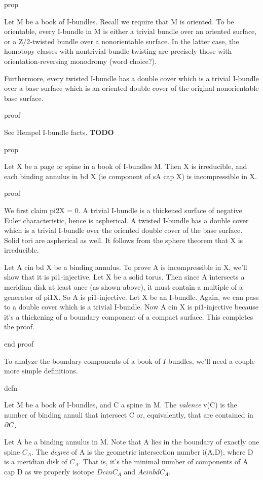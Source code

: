 prop

Let M be a book of I-bundles. Recall we require that M is oriented. To be
orientable, every I-bundle in M is either a trivial bundle over an oriented
surface, or a Z/2-twisted bundle over a nonorientable surface. In the latter
case, the homotopy classes with nontrivial bundle twisting are precisely those
with orientation-reversing monodromy (word choice?).

Furthermore, every twisted I-bundle has a double cover which is a trivial
I-bundle over a base surface which is an oriented double cover of the original
nonorientable base surface.

proof

See Hempel I-bundle facts. {\bf TODO}

prop

Let X be a page or spine in a book of I-bundles M. Then X is irreducible, and
each binding annulus in bd X (ie component of sA cap X) is incompressible in X.

proof

We first claim pi2X = 0. A trivial I-bundle is a thickened surface of negative
Euler characteristic, hence is aspherical. A twisted I-bundle has a double
cover which is a trivial I-bundle over the oriented double cover of the base
surface. Solid tori are aspherical as well. It follows from the sphere theorem
that X is irreducible.

Let A cin bd X be a binding annulus. To prove A is incompressible in X, we'll
show that it is pi1-injective. Let X be a solid torus. Then since A intersects
a meridian disk at least once (as shown above), it must contain a multiple of
a generator of pi1X. So A is pi1-injective. Let X be an I-bundle. Again, we can
pass to a double cover which is a trivial I-bundle. Now A cin X is
pi1-injective because it's a thickening of a boundary component of a compact
surface. This completes the proof.

end proof

To analyze the boundary components of a book of $I$-bundles, we'll need
a couple more simple definitions.

defn

Let M be a book of I-bundles, and C a spine in M.  The \emph{valence} v(C) is
the number of binding annuli that intersect C or, equivalently, that are
contained in $\partial C$.

Let A be a binding annulus in M. Note that A lies in the boundary of exactly
one spine $C_A$. The \emph{degree} of A is the geometric intersection number
i(A,D), where D is a meridian disk of $C_A$. That is, it's the minimal number
of components of A cap D as we properly isotope $D cin C_A$ and $A cin bd C_A$.

